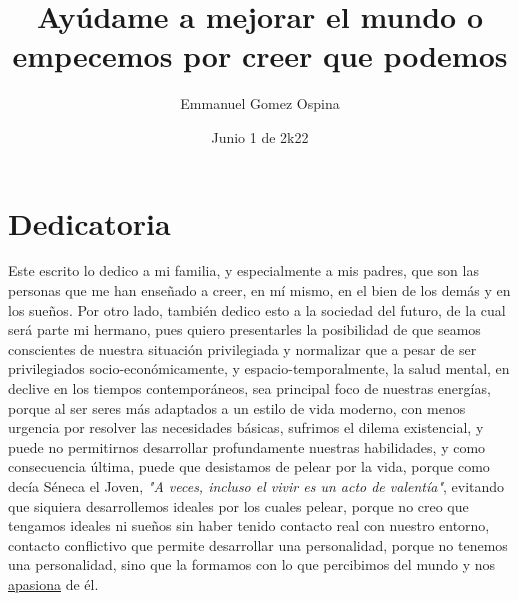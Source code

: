\documentclass{article}
\title{Ayúdame a mejorar el mundo o empecemos por creer que podemos}
\author{Emmanuel Gomez Ospina}
\date{Junio 1 de 2k22}
\begin{document}
\maketitle


\section*{Dedicatoria}
Este escrito lo dedico a mi familia, y especialmente a mis padres, que son las personas que me han enseñado a creer, en mí mismo, en el bien de los demás y en los sueños. Por otro lado, también dedico esto a la sociedad del futuro, de la cual será parte mi hermano, pues quiero presentarles la posibilidad de que seamos conscientes de nuestra situación privilegiada y normalizar que a pesar de ser privilegiados socio-económicamente, y espacio-temporalmente, la salud mental, en declive en los tiempos contemporáneos, sea principal foco de nuestras energías, porque al ser seres más adaptados a un estilo de vida moderno, con menos urgencia por resolver las necesidades básicas, sufrimos el dilema existencial, y puede no permitirnos desarrollar profundamente nuestras habilidades, y como consecuencia última, puede que desistamos de pelear por la vida, porque como decía Séneca el Joven, \textit{"A veces, incluso el vivir es un acto de valentía"}, evitando que siquiera desarrollemos ideales por los cuales pelear, porque no creo que tengamos ideales ni sueños sin haber tenido contacto real con nuestro entorno, contacto conflictivo que permite desarrollar una personalidad, porque no tenemos una personalidad, sino que la formamos con lo que percibimos del mundo y nos \href{https://youtu.be/-cpKC1II1Dc}{apasiona} de él.
\end{document}
